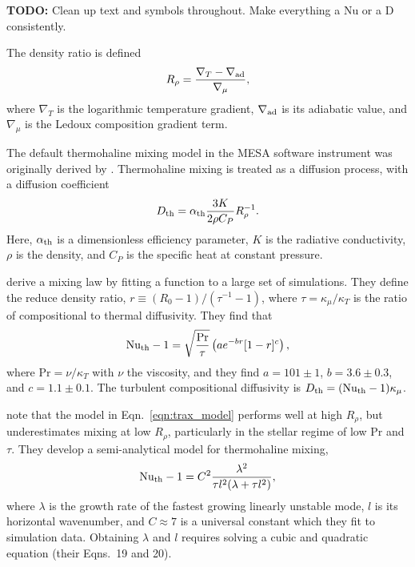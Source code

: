 \textbf{TODO:} Clean up text and symbols throughout. Make everything a Nu or a D consistently.

The density ratio is defined \citep{ulrich_1972}
\begin{equation}
    R_\rho = \frac{\nabla_T - \nabla_{\rm{ad}}}{{\nabla_\mu}},
\end{equation}
where $\nabla_T$ is the logarithmic temperature gradient, $\nabla_{\rm{ad}}$ is its adiabatic value, and $\nabla_\mu$ is the Ledoux composition gradient term.

The default thermohaline mixing model in the MESA software instrument \citep{mesa2} was originally derived by \citet{ulrich_1972, kippenhahn_etal_1980}.
Thermohaline mixing is treated as a diffusion process, with a diffusion coefficient
\begin{equation}
    D_{\rm{th}} = \alpha_{\rm{th}} \frac{3 K}{2\rho C_P}R_{\rho}^{-1}.
    \label{eqn:kipp_model}
\end{equation}
Here, $\alpha_{\rm{th}}$ is a dimensionless efficiency parameter, $K$ is the radiative conductivity, $\rho$ is the density, and $C_P$ is the specific heat at constant pressure. 

\citet{traxler_etal_2011} derive a mixing law by fitting a function to a large set of simulations.
They define the reduce density ratio, $r \equiv (R_0 - 1)/(\tau^{-1} - 1)$, where $\tau = \kappa_\mu/\kappa_T$ is the ratio of compositional to thermal diffusivity.
They find that
\begin{equation}
    \mathrm{Nu}_{\rm{th}} - 1 = \sqrt{\frac{\mathrm{Pr}}{\tau}}\left(a e^{-br}[1 - r]^c\right),
    \label{eqn:trax_model}
\end{equation}
where $\mathrm{Pr} = \nu / \kappa_T$ with $\nu$ the viscosity, and they find $a = 101 \pm 1$, $b = 3.6 \pm 0.3$, and $c = 1.1 \pm 0.1$.
The turbulent compositional diffusivity is $D_{\rm{th}} = (\mathrm{Nu}_{\rm{th}} - 1)\kappa_\mu$.


\citet{brown_etal_2013} note that the model in Eqn.~\ref{eqn:trax_model} performs well at high $R_\rho$, but underestimates mixing at low $R_\rho$, particularly in the stellar regime of low Pr and $\tau$.
They develop a semi-analytical model for thermohaline mixing,
\begin{equation}
    \mathrm{Nu}_{\rm{th}} - 1 = C^2\frac{\lambda^2}{\tau l^2(\lambda + \tau l^2)},
\end{equation}
where $\lambda$ is the growth rate of the fastest growing linearly unstable mode, $l$ is its horizontal wavenumber, and $C \approx 7$ is a universal constant which they fit to simulation data.
Obtaining $\lambda$ and $l$ requires solving a cubic and quadratic equation (their Eqns.~19 and 20).

